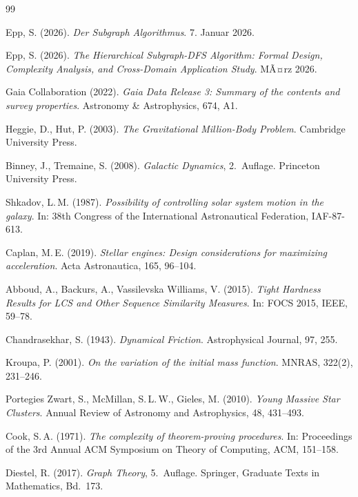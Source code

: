 ﻿\documentclass[a4paper,12pt]{report}
\theoremstyle{definition}
\begin{document}
\begin{thebibliography}{99}

Epp, S. (2026). \textit{Der Subgraph Algorithmus}. 7. Januar 2026.

Epp, S. (2026). \textit{The Hierarchical Subgraph-DFS Algorithm: Formal Design, Complexity Analysis, and Cross-Domain Application Study}. MÃ¤rz 2026.

Gaia Collaboration (2022). \textit{Gaia Data Release 3: Summary of the contents and survey properties}. Astronomy \& Astrophysics, 674, A1.

Heggie, D., Hut, P. (2003). \textit{The Gravitational Million-Body Problem}. Cambridge University Press.

Binney, J., Tremaine, S. (2008). \textit{Galactic Dynamics}, 2.\ Auflage. Princeton University Press.

Shkadov, L.\,M. (1987). \textit{Possibility of controlling solar system motion in the galaxy}. In: 38th Congress of the International Astronautical Federation, IAF-87-613.

Caplan, M.\,E. (2019). \textit{Stellar engines: Design considerations for maximizing acceleration}. Acta Astronautica, 165, 96--104.

Abboud, A., Backurs, A., Vassilevska Williams, V. (2015). \textit{Tight Hardness Results for LCS and Other Sequence Similarity Measures}. In: FOCS 2015, IEEE, 59--78.

Chandrasekhar, S. (1943). \textit{Dynamical Friction}. Astrophysical Journal, 97, 255.

Kroupa, P. (2001). \textit{On the variation of the initial mass function}. MNRAS, 322(2), 231--246.

Portegies Zwart, S., McMillan, S.\,L.\,W., Gieles, M. (2010). \textit{Young Massive Star Clusters}. Annual Review of Astronomy and Astrophysics, 48, 431--493.

Cook, S.\,A. (1971). \textit{The complexity of theorem-proving procedures}. In: Proceedings of the 3rd Annual ACM Symposium on Theory of Computing, ACM, 151--158.


Diestel, R. (2017). \textit{Graph Theory}, 5.\ Auflage. Springer, Graduate Texts in Mathematics, Bd.~173.


\end{thebibliography}
\end{document}
